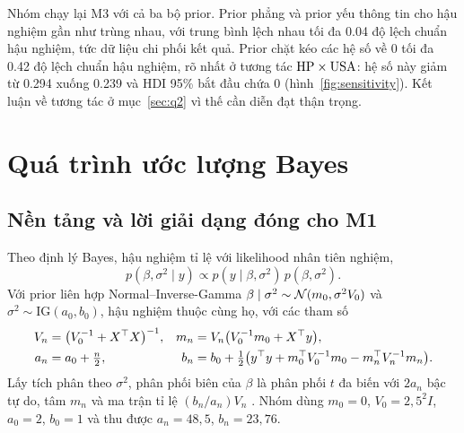 \documentclass[12pt,a4paper]{report}
\begin{document}
Nhóm chạy lại M3 với cả ba bộ prior. Prior phẳng và prior yếu thông tin cho hậu
nghiệm gần như trùng nhau, với trung bình lệch nhau tối đa \num{0.04} độ lệch
chuẩn hậu nghiệm, tức dữ liệu chi phối kết quả. Prior chặt kéo các hệ số về 0
tối đa \num{0.42} độ lệch chuẩn hậu nghiệm, rõ nhất ở tương tác
$\mathrm{HP} \times \mathrm{USA}$: hệ số này giảm từ \num{0.294} xuống \num{0.239} và HDI 95\%
bắt đầu chứa 0 (hình~\ref{fig:sensitivity}). Kết luận về tương tác ở
mục~\ref{sec:q2} vì thế cần diễn đạt thận trọng.


\chapter{Quá trình ước lượng Bayes}
\label{sec:estimation}

\section{Nền tảng và lời giải dạng đóng cho M1}
\label{sec:conjugate}

Theo định lý Bayes, hậu nghiệm tỉ lệ với likelihood nhân tiên nghiệm,
%
\begin{equation}
  \label{eq:bayes}
  p(\beta, \sigma^2 \mid y) \propto p(y \mid \beta, \sigma^2)\, p(\beta, \sigma^2).
\end{equation}
%
Với prior liên hợp Normal--Inverse-Gamma $\beta \mid \sigma^2 \sim
\mathcal{N}(m_0, \sigma^2 V_0)$ và $\sigma^2 \sim \text{IG}(a_0, b_0)$, hậu nghiệm thuộc
cùng họ, với các tham số
%
\begin{equation}
  \label{eq:nig}
  \begin{aligned}
    V_n &= \bigl(V_0^{-1} + X^{\top} X\bigr)^{-1}, &
    m_n &= V_n \bigl(V_0^{-1} m_0 + X^{\top} y\bigr), \\
    a_n &= a_0 + \tfrac{n}{2}, &
    b_n &= b_0 + \tfrac{1}{2}\bigl(y^{\top} y + m_0^{\top} V_0^{-1} m_0 - m_n^{\top} V_n^{-1} m_n\bigr).
  \end{aligned}
\end{equation}
%
Lấy tích phân theo $\sigma^2$, phân phối biên của $\beta$ là phân phối $t$ đa
biến với $2a_n$ bậc tự do, tâm $m_n$ và ma trận tỉ lệ $(b_n / a_n) V_n$
\cite{gelman2013bda}. Nhóm dùng $m_0 = 0$, $V_0 = 2{,}5^2 I$, $a_0 = 2$, $b_0 = 1$
và thu được $a_n = 48{,}5$, $b_n = 23{,}76$.
\end{document}
